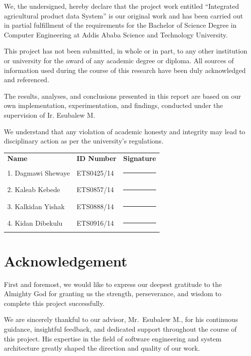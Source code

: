 \documentclass[12pt,a4paper,oneside]{report}
\begin{document}
We, the undersigned, hereby declare that the project work entitled ``Integrated agricultural product data System'' is our original work and has been carried out in partial fulfillment of the requirements for the Bachelor of Science Degree in Computer Engineering at Addis Ababa Science and Technology University.

This project has not been submitted, in whole or in part, to any other institution or university for the award of any academic degree or diploma. All sources of information used during the course of this research have been duly acknowledged and referenced.

The results, analyses, and conclusions presented in this report are based on our own implementation, experimentation, and findings, conducted under the supervision of Ir. Esubalew M.

We understand that any violation of academic honesty and integrity may lead to disciplinary action as per the university's regulations.

\vspace{1cm}
\begin{tabular}{lll}
\textbf{Name} & \textbf{ID Number} & \textbf{Signature} \\[0.3cm]
1. Dagmawi Shewaye  & ETS0425/14 & \rule{5cm}{0.4pt} \\[0.3cm]
2. Kaleab Kebede    & ETS0857/14 & \rule{5cm}{0.4pt} \\[0.3cm]
3. Kalkidan Yishak  & ETS0888/14 & \rule{5cm}{0.4pt} \\[0.3cm]
4. Kidan Dibekulu   & ETS0916/14 & \rule{5cm}{0.4pt} \\
\end{tabular}

\chapter*{Acknowledgement}

First and foremost, we would like to express our deepest gratitude to the Almighty God for granting us the strength, perseverance, and wisdom to complete this project successfully.

We are sincerely thankful to our advisor, Mr.\ Esubalew M., for his continuous guidance, insightful feedback, and dedicated support throughout the course of this project. His expertise in the field of software engineering and system architecture greatly shaped the direction and quality of our work.
\end{document}
